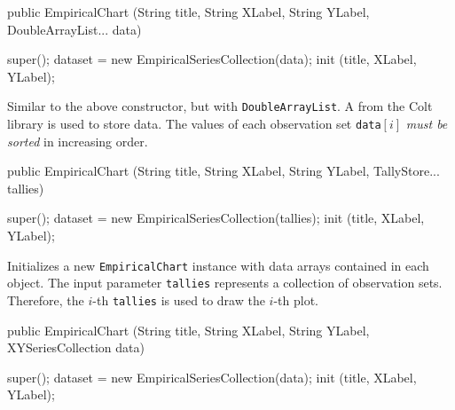 \begin{htmlonly}
\end{htmlonly}
\begin{code}

   public EmpiricalChart (String title, String XLabel, String YLabel,
                          DoubleArrayList... data) \begin{hide} {
      super();
      dataset = new EmpiricalSeriesCollection(data);
      init (title, XLabel, YLabel);
   }\end{hide}
\end{code}
\begin{tabb}
   Similar to the above constructor, but with \texttt{DoubleArrayList}.
   A  from the Colt library is
   used to store data. The values of each observation set \texttt{data}$[i]$
   \emph{must be sorted} in increasing order.
\end{tabb}
\begin{htmlonly}
\end{htmlonly}
\begin{code}

   public EmpiricalChart (String title, String XLabel, String YLabel,
                          TallyStore... tallies) \begin{hide} {
      super();
      dataset = new EmpiricalSeriesCollection(tallies);
      init (title, XLabel, YLabel);
   }\end{hide}
\end{code}
\begin{tabb}
   Initializes a new \texttt{EmpiricalChart} instance with data arrays
   contained in each
    object. The input
   parameter \texttt{tallies} represents a collection of observation sets.
   Therefore, the $i$-th \texttt{tallies} is used to draw
     the $i$-th plot.
\end{tabb}
\begin{htmlonly}
\end{htmlonly}
\begin{code}

   public EmpiricalChart (String title, String XLabel, String YLabel,
                          XYSeriesCollection data) \begin{hide} {
      super();
      dataset = new EmpiricalSeriesCollection(data);
      init (title, XLabel, YLabel);
   }\end{hide}
\end{code}
